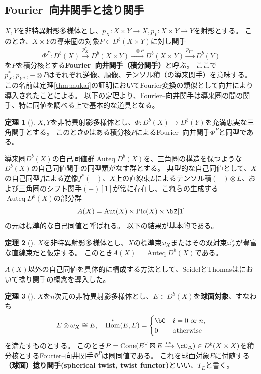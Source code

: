 \documentclass[uplatex,11pt,a4paper,dvipdfmx]{jsarticle}
\numberwithin{equation}{section}
\numberwithin{figure}{section}
\theoremstyle{definition}
\newtheorem{theorem}{定理}[section]
\DeclareMathOperator{\Hom}{\mathrm{Hom}}
\DeclareMathOperator{\Auteq}{\mathrm{Auteq}}
\DeclareMathOperator{\Cone}{\mathrm{Cone}}
\DeclareMathOperator{\ev}{\mathrm{ev}}
\DeclareMathOperator{\Pic}{\mathrm{Pic}}
\DeclareMathOperator{\Aut}{\mathrm{Aut}}
\begin{document}
\subsection{Fourier--向井関手と捻り関手}
$X, Y$を非特異射影多様体とし、$p_X \colon X\times Y \to X, p_Y \colon X \times Y \to Y$を射影とする。
このとき、$X \times Y$の導来圏の対象$P \in D^b(X \times Y)$に対し関手
\begin{equation}
    \Phi^P \colon D^b(X) \xrightarrow{p_X^*} D^b(X \times Y) \xrightarrow{ - \otimes P} D^b(X \times Y) \xrightarrow{p_{Y*}} D^b(Y)
\end{equation}
を$P$を積分核とする\textbf{Fourier--向井関手（積分関手）}と呼ぶ。
ここで$p_X^*, p_{Y*}, - \otimes P$はそれぞれ逆像、順像、テンソル積（の導来関手）を意味する。
この名前は定理\ref{thm:mukai}の証明においてFourier変換の類似として向井により導入されたことによる。
以下の定理より、Fourier--向井関手は導来圏の間の関手、特に同値を調べる上で基本的な道具となる。
\begin{theorem}[\cite{MR1465519}]
    $X, Y$を非特異射影多様体とし、$\Phi \colon D^b(X) \to D^b(Y)$を充満忠実な三角関手とする。
    このとき$\Phi$はある積分核$P$によるFourier--向井関手$\Phi^P$と同型である。
\end{theorem}
導来圏$D^b(X)$の自己同値群$\Auteq D^b(X)$を、三角圏の構造を保つような$D^b(X)$の自己同値関手の同型類がなす群とする。
典型的な自己同値として、$X$の自己同型$f$による逆像$f^*(-)$、$X$上の直線束$L$によるテンソル積$(-)\otimes L$、および三角圏のシフト関手$(-)[1]$が常に存在し、これらの生成する$\Auteq D^b(X)$の部分群
\begin{equation}
    A(X) = \Aut(X) \ltimes \Pic(X) \times \bZ[1]
\end{equation}
の元は標準的な自己同値と呼ばれる。
以下の結果が基本的である。
\begin{theorem}[\cite{MR1818984}]\label{BO}
    $X$を非特異射影多様体とし、$X$の標準束$\omega_X$またはその双対束$\omega_X^\vee$が豊富な直線束だと仮定する。
    このとき$A(X) = \Auteq D^b(X)$である。
\end{theorem}
$A(X)$以外の自己同値を具体的に構成する方法として、SeidelとThomasは\cite{MR1831820}において捻り関手の概念を導入した。
\begin{theorem}[\cite{MR1831820}]
    $X$を$n$次元の非特異射影多様体とし、$E \in D^b(X)$を\textbf{球面対象}、すなわち\begin{equation}
        E \otimes \omega_X \cong E,\quad \Hom^i(E, E) = \begin{cases}
            \bC & i = \text{$0$ or $n$}, \\
            0   & \text{otherwise}
        \end{cases}
    \end{equation}を満たすものとする。
    このとき$P = \Cone(E^\vee \boxtimes E \xrightarrow{\ev} \cO_\Delta) \in D^b(X \times X)$を積分核とするFourier--向井関手$\Phi^P$は圏同値である。
    これを球面対象$E$に付随する\textbf{（球面）捻り関手(spherical twist, twist functor)}といい、$T_E$と書く。
\end{theorem}
\end{document}
